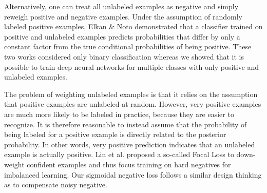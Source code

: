 Alternatively, one can treat all unlabeled examples as negative and simply reweigh positive and negative examples\cite{lee2003learning}.
Under the assumption of randomly labeled positive examples, Elkan \& Noto\cite{elkan2008learning} demonstrated that a classifier trained on positive and unlabeled examples predicts probabilities that differ by only a constant factor from the true conditional probabilities of being positive.
These two works considered only binary classification whereas we showed that it is possible to train deep neural networks for multiple classes with only positive and unlabeled examples.

The problem of weighting unlabeled examples is that it relies on the assumption that positive examples are unlabeled at random.
However, very positive examples are much more likely to be labeled in practice, because they are easier to recognize.
It is therefore reasonable to instead assume that the probability of being labeled for a positive example is directly related to the posterior probability.\cite{tax2016class}
In other words, very positive prediction indicates that an unlabeled example is actually positive.
Lin et al.\cite{lin2017focal} proposed a so-called Focal Loss to down-weight confident examples and thus focus training on hard negatives for imbalanced learning.
Our sigmoidal negative loss follows a similar design thinking as \cite{lin2017focal} to compensate noisy negative.
